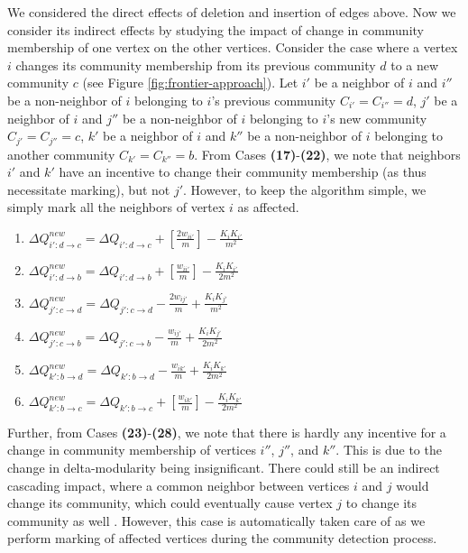 We considered the direct effects of deletion and insertion of edges above. Now we consider its indirect effects by studying the impact of change in community membership of one vertex on the other vertices. Consider the case where a vertex $i$ changes its community membership from its previous community $d$ to a new community $c$ (see Figure \ref{fig:frontier-approach}). Let $i'$ be a neighbor of $i$ and $i''$ be a non-neighbor of $i$ belonging to $i$'s previous community $C_{i'} = C_{i''} = d$, $j'$ be a neighbor of $i$ and $j''$ be a non-neighbor of $i$ belonging to $i$'s new community $C_{j'} = C_{j''} = c$, $k'$ be a neighbor of $i$ and $k''$ be a non-neighbor of $i$ belonging to another community $C_{k'} = C_{k''} = b$. From Cases \textbf{(17)}-\textbf{(22)}, we note that neighbors $i'$ and $k'$ have an incentive to change their community membership (as thus necessitate marking), but not $j'$. However, to keep the algorithm simple, we simply mark all the neighbors of vertex $i$ as affected.

\begin{enumerate}[start=17]
  \item $\Delta Q_{i':d \rightarrow c}^{new} = \Delta Q_{i':d \rightarrow c} + [\frac{2w_{ii'}}{m}] - \frac{K_iK_{i'}}{m^2}$
  \item $\Delta Q_{i':d \rightarrow b}^{new} = \Delta Q_{i':d \rightarrow b} + [\frac{w_{ii'}}{m}] - \frac{K_iK_{i'}}{2m^2}$
  \item $\Delta Q_{j':c \rightarrow d}^{new} = \Delta Q_{j':c \rightarrow d} - \frac{2w_{ij'}}{m} + \frac{K_iK_{j'}}{m^2}$
  \item $\Delta Q_{j':c \rightarrow b}^{new} = \Delta Q_{j':c \rightarrow b} - \frac{w_{ij'}}{m} + \frac{K_iK_{j'}}{2m^2}$
  \item $\Delta Q_{k':b \rightarrow d}^{new} = \Delta Q_{k':b \rightarrow d} - \frac{w_{ik'}}{m} + \frac{K_iK_{k'}}{2m^2}$
  \item $\Delta Q_{k':b \rightarrow c}^{new} = \Delta Q_{k':b \rightarrow c} + [\frac{w_{ik'}}{m}] - \frac{K_iK_{k'}}{2m^2}$
\end{enumerate}

Further, from Cases \textbf{(23)}-\textbf{(28)}, we note that there is hardly any incentive for a change in community membership of vertices $i''$, $j''$, and $k''$. This is due to the change in delta-modularity being insignificant. There could still be an indirect cascading impact, where a common neighbor between vertices $i$ and $j$ would change its community, which could eventually cause vertex $j$ to change its community as well \cite{com-zarayeneh21}. However, this case is automatically taken care of as we perform marking of affected vertices during the community detection process.

